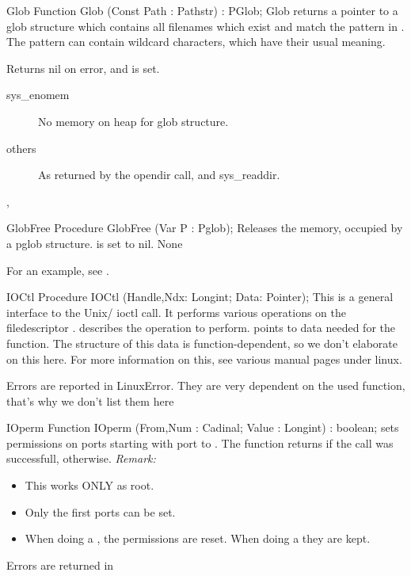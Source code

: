 
\begin{function}{Glob}
\Declaration
Function Glob (Const Path : Pathstr) : PGlob;
\Description
Glob returns a pointer to a glob structure which contains all filenames which
exist and match the pattern in .
The pattern can contain wildcard characters, which have their
usual meaning.

\Errors
 Returns nil on error, and  is set.
\begin{description}
\item[sys\_enomem] No memory on heap for glob structure.
\item[others] As returned by the opendir call, and sys\_readdir.
\end{description}

\SeeAlso
{},  
\end{function}


\begin{procedure}{GlobFree}
\Declaration
Procedure GlobFree (Var P : Pglob);
\Description
Releases the memory, occupied by a pglob structure.  is set to nil.
\Errors
None
\SeeAlso
\end{procedure}
For an example, see .

\begin{procedure}{IOCtl}
\Declaration
Procedure IOCtl (Handle,Ndx: Longint; Data: Pointer);
\Description
This is a general interface to the Unix/ \linux ioctl call.
It performs various operations on the filedescriptor .
 describes the operation to perform.
 points to data needed for the  function. 
The structure of this data is function-dependent, so we don't elaborate on
this here. 
For more information on this, see various manual pages under linux.

\Errors

Errors are reported in LinuxError. They are very dependent on the used
function, that's why we don't list them here

\SeeAlso
{}
\end{procedure}


\begin{function}{IOperm}
\Declaration
Function IOperm (From,Num : Cadinal; Value : Longint) : boolean;
\Description
{}
  sets permissions on  ports starting with port  to 
  . The function returns  if the call was successfull,
   otherwise.
{\em Remark:}
\begin{itemize}
\item This works ONLY as root.
\item Only the first  ports can be set.
\item When doing a , the permissions are reset. When doing a
 they are kept.
\end{itemize}

\Errors
Errors are returned in 
\SeeAlso
{}
\end{function}

